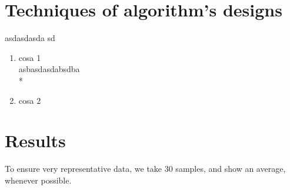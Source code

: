 \documentclass[twocolumn]{IEEEtran}
\begin{document}
\section{Techniques of algorithm's designs}

	asdasdasda sd 
\begin{enumerate}
	\item cosa 1 \\
    asbasdasdabsdba \\*
    \item cosa 2 \\
    
\end{enumerate}

\section{Results}

To ensure very representative data, we take 30 samples, and show an average, whenever possible.\\
\end{document}
